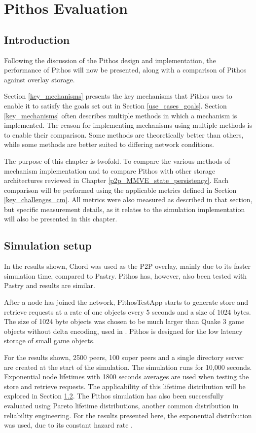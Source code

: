 \chapter{Pithos Evaluation}
    \label{chp:EVALUATION}
\section{Introduction}

Following the discussion of the Pithos design and implementation, the performance of Pithos will now be presented, along with a comparison of Pithos against overlay storage.

Section \ref{key_mechanisms} presents the key mechanisms that Pithos uses to enable it to satisfy the goals set out in Section \ref{use_cases_goals}. Section \ref{key_mechanisms} often describes multiple methods in which a mechanism is implemented. The reason for implementing mechanisms using multiple methods is to enable their comparison. Some methods are theoretically better than others, while some methods are better suited to differing network conditions.

The purpose of this chapter is twofold. To compare the various methods of mechanism implementation and to compare Pithos with other storage architectures reviewed in Chapter \ref{p2p_MMVE_state_persistency}. Each comparison will be performed using the applicable metrics defined in Section \ref{key_challenges_cm}. All metrics were also measured as described in that section, but specific measurement details, as it relates to the simulation implementation will also be presented in this chapter.

\section{Simulation setup}

In the results shown, Chord was used as the P2P overlay, mainly due to its faster simulation time, compared to Pastry. Pithos has, however, also been tested with Pastry and results are similar.

After a node has joined the network, PithosTestApp starts to generate store and retrieve requests at a rate of one objects every 5 seconds and a size of 1024 bytes. The size of 1024 byte objects was chosen to be much larger than Quake 3 game objects without delta encoding, used in \cite{Bharambe_Donnybrook}. Pithos is designed for the low latency storage of small game objects.

For the results shown, 2500 peers, 100 super peers and a single directory server are created at the start of the simulation. The simulation runs for 10,000 seconds. Exponential node lifetimes with 1800 seconds averages are used when testing the store and retrieve requests. The applicability of this lifetime distribution will be explored in Section \ref{}. The Pithos simulation has also been successfully evaluated using Pareto lifetime distributions, another common distribution in reliability engineering. For the results presented here, the exponential distribution was used, due to its constant hazard rate \cite{}.

